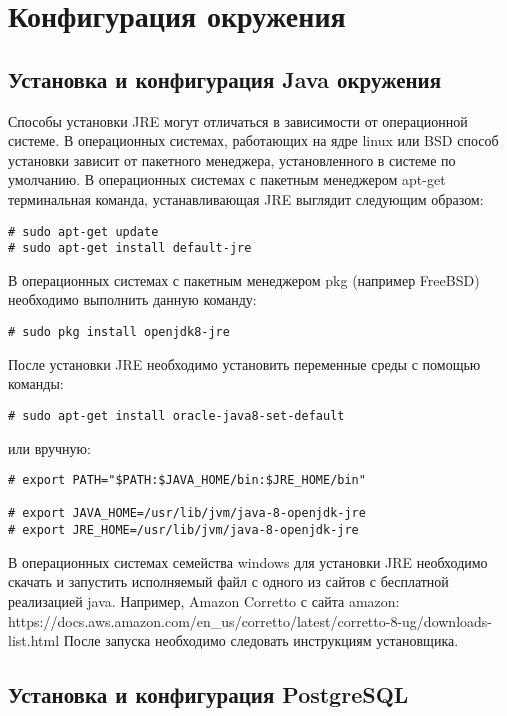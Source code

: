 \section{Конфигурация окружения}

\subsection{Установка и конфигурация Java окружения}

Способы установки JRE могут отличаться в зависимости от операционной системе. В операционных системах, работающих на ядре linux или BSD способ установки зависит от пакетного менеджера, установленного в системе по умолчанию.
В операционных системах с пакетным менеджером apt-get терминальная команда, устанавливающая JRE выглядит следующим образом:
\begin{lstlisting}
# sudo apt-get update
# sudo apt-get install default-jre
\end{lstlisting}

В операционных системах с пакетным менеджером pkg (например FreeBSD) необходимо выполнить данную команду:
\begin{lstlisting}
# sudo pkg install openjdk8-jre
\end{lstlisting}
После установки JRE необходимо установить переменные среды с помощью команды:
\begin{lstlisting}
# sudo apt-get install oracle-java8-set-default
\end{lstlisting}
или вручную:
\begin{lstlisting}
# export PATH="$PATH:$JAVA_HOME/bin:$JRE_HOME/bin"

# export JAVA_HOME=/usr/lib/jvm/java-8-openjdk-jre
# export JRE_HOME=/usr/lib/jvm/java-8-openjdk-jre
\end{lstlisting}

В операционных системах семейства windows для установки JRE необходимо скачать и запустить исполняемый файл с одного из сайтов с бесплатной реализацией java.
Например, Amazon Corretto с сайта amazon: https://docs.aws.amazon.com/en_us/corretto/latest/corretto-8-ug/downloads-list.html
После запуска необходимо следовать инструкциям установщика.

\subsection{Установка и конфигурация PostgreSQL}

